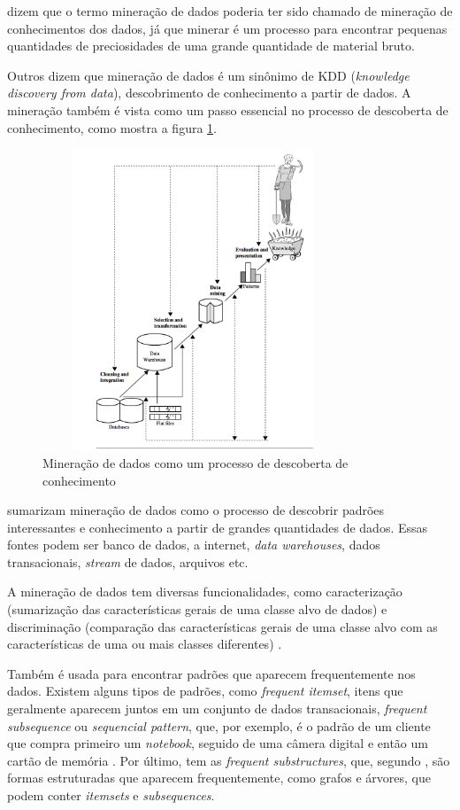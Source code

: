  dizem que o termo mineração de dados poderia ter sido chamado de mineração de conhecimentos dos dados, já que minerar é um processo para encontrar pequenas quantidades de preciosidades de uma grande quantidade de material bruto. 

Outros dizem que mineração de dados é um sinônimo de KDD (\textit{knowledge discovery from data}), descobrimento de conhecimento a partir de dados. A mineração também é vista como um passo essencial no processo de descoberta de conhecimento, como mostra a figura \ref{kdd}. 

\begin{figure}[H]
\centering
\includegraphics[height=9cm, width=9cm]{imagens/kdd.png}
\caption{Mineração de dados como um processo de descoberta de conhecimento \citep{jmj}}
\label{kdd}
\end{figure}

\citeauthor{jmj} sumarizam mineração de dados como o processo de descobrir padrões interessantes e conhecimento a partir de grandes quantidades de dados. Essas fontes podem ser banco de dados, a internet, \textit{data warehouses}, dados transacionais, \textit{stream} de dados, arquivos etc. 

A mineração de dados tem diversas funcionalidades, como caracterização (sumarização das características gerais de uma classe alvo de dados) e discriminação (comparação das características gerais de uma classe alvo com as características de uma ou mais classes diferentes) \citep{jmj}. 

Também é usada para encontrar padrões que aparecem frequentemente nos dados. Existem alguns tipos de padrões, como \textit{frequent itemset}, itens que geralmente aparecem juntos em um conjunto de dados transacionais, \textit{frequent subsequence} ou \textit{sequencial pattern}, que, por exemplo, é o padrão de um cliente que compra primeiro um \textit{notebook}, seguido de uma câmera digital e então um cartão de memória \citep{jmj}. Por último, tem as \textit{frequent substructures}, que, segundo \citeauthor{jmj}, são formas estruturadas que aparecem frequentemente, como grafos e árvores, que podem conter \textit{itemsets} e \textit{subsequences}.

